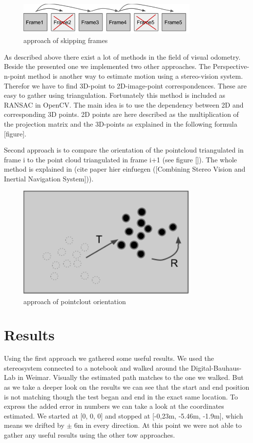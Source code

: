 \documentclass[11pt]{article}
\begin{document}
	\begin{figure}[ht!]
		\centering
		\includegraphics[width=90mm]{images/skipFrames.png}
		\caption{approach of skipping frames \label{overflow}}
	\end{figure}
	
	As described above there exist a lot of methods in the field of visual odometry. Beside the presented one we implemented two other approaches.
	The Perspective-n-point method is another way to estimate motion using a stereo-vision system. Therefor we have to find 3D-point to 2D-image-point correspondences. These are easy to gather using triangulation. Fortunately this method is included as RANSAC in OpenCV. The main idea is to use the dependency between 2D and corresponding 3D points. 2D points are here described as the multiplication of the projection matrix and the 3D-points as explained in the following formula [figure].
	
	Second approach is to compare the orientation of the pointcloud triangulated in frame i to the point cloud triangulated in frame i+1 (see figure []).
	The whole method is explained in (cite paper hier einfuegen ([Combining Stereo Vision and Inertial Navigation System])).

	\begin{figure}[ht!]
		\centering
		\includegraphics[width=90mm]{images/pointcloud_orientation.png}
		\caption{approach of pointclout orientation \label{overflow}}
	\end{figure}
	
	\section{Results}
	Using the first approach we gathered some useful results. We used the stereosystem connected to a notebook and walked around the Digital-Bauhaus-Lab in Weimar. Visually the estimated path matches to the one we walked. But as we take a deeper look on the results we can see that the start and end position is not matching though the test began and end in the exact same location. To express the added error in numbers we can take a look at the coordinates estimated. We started at [0, 0, 0] and stopped at [-0,23m, -5.46m, -1.9m], which means we drifted by $\pm$ 6m in every direction. At this point we were not able to gather any useful results using the other tow approaches.
\end{document}
